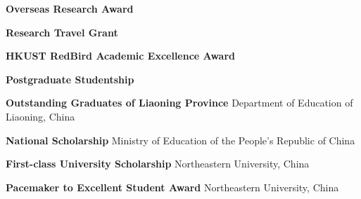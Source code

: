 %
%
%


\begin{scholarship}
	{\textbf{Overseas Research Award}}

	{\textbf{Research Travel Grant}}

	{\textbf{HKUST RedBird Academic Excellence Award}}

	{\textbf{Postgraduate Studentship}}

	{\textbf{Outstanding Graduates of Liaoning Province}}
	\scholarshipentry{}
	{Department of Education of Liaoning, China}

	{\textbf{National Scholarship}}
	\scholarshipentry{}
	{Ministry of Education of the People's Republic of China}

	{\textbf{First-class University Scholarship}}
	\scholarshipentry{}
	{Northeastern University, China}

	{\textbf{Pacemaker to Excellent Student Award}}
	\scholarshipentry{}
	{Northeastern University, China}

\end{scholarship}
